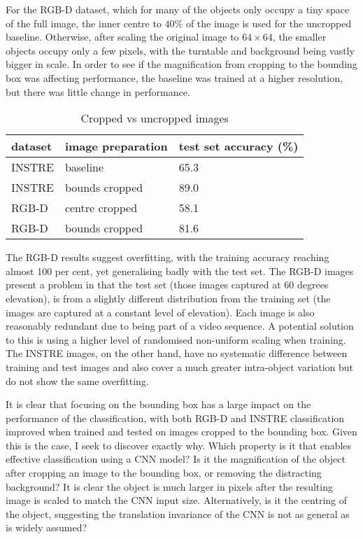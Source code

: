 For the RGB-D dataset, which for many of the objects only occupy a tiny space of the full image, the inner centre to $40\%$ of the image is used for the uncropped baseline. Otherwise, after scaling the original image to $ 64 \times 64$, the smaller objects occupy only a few pixels, with the turntable and background being vastly bigger in scale. In order to see if the magnification from cropping to the bounding box was affecting performance,  the baseline was trained at a higher resolution, but there was little change in performance.


\begin{table}[h]
  \centering
    \caption{Cropped vs uncropped images }
    
  \begin{tabular}{ l l l }
    
    dataset & image preparation & test set accuracy (\%) \\
    \toprule
    
    INSTRE & baseline &  65.3 \\
    INSTRE & bounds cropped & 89.0 \\
    
    RGB-D & centre cropped & 58.1 \\
    RGB-D & bounds cropped & 81.6 \\
    
    \bottomrule
  \end{tabular}
\label{fig:focus_crop}
\end{table}

The RGB-D results suggest overfitting, with the training accuracy reaching almost 100 per cent, yet generalising badly with the test set. The RGB-D images present a problem in that the test set (those images captured at 60 degrees elevation), is from a slightly different distribution from the training set (the images are captured at a constant level of elevation). Each image is also reasonably redundant due to being part of a video sequence. A potential solution to this is using a higher level of randomised non-uniform scaling when training. The INSTRE images, on the other hand, have no systematic difference between training and test images and also cover a much greater intra-object variation but do not show the same overfitting.

It is clear that focusing on the bounding box has a large impact on the performance of the classification, with both RGB-D and INSTRE classification improved when trained and tested on images cropped to the bounding box. Given this is the case, I seek to discover exactly why. Which property is it that enables effective classification using a CNN model? Is it the magnification of the object after cropping an image to the bounding box, or removing the distracting background? It is clear the object is much larger in pixels after the resulting image is scaled to match the CNN input size. Alternatively, is it the centring of the object, suggesting the translation invariance of the CNN is not as general as is widely assumed?



